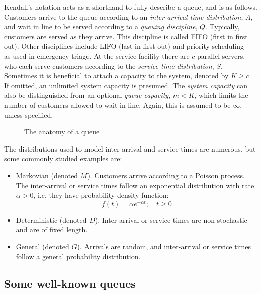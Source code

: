 Kendall's notation acts as a shorthand to fully describe a queue, and is as
follows. Customers arrive to the queue according to an \emph{inter-arrival time
distribution}, \(A\), and wait in line to be served according to a \emph{queuing
discipline}, \(Q\). Typically, customers are served as they arrive. This
discipline is called FIFO (first in first out). Other disciplines include LIFO
(last in first out) and priority scheduling --- as used in emergency triage. At
the service facility there are \(c\) parallel servers, who each serve customers
according to the \emph{service time distribution}, \(S\). Sometimes it is
beneficial to attach a capacity to the system, denoted by \(K \ge c\). If
omitted, an unlimited system capacity is presumed. The \emph{system capacity}
can also be distinguished from an optional \emph{queue capacity}, \(m < K\),
which limits the number of customers allowed to wait in line. Again, this is
assumed to be \(\infty\), unless specified.

\begin{figure}[htbp]
    \centering%
    \resizebox{\imgwidth}{!}{%
        
    }\caption{The anatomy of a queue}\label{fig:queue}
\end{figure}

The distributions used to model inter-arrival and service times are numerous,
but some commonly studied examples are:

\begin{itemize}
    \item Markovian (denoted \(M\)). Customers arrive according to a Poisson
        process. The inter-arrival or service times follow an exponential
        distribution with rate \(\alpha > 0\), i.e. they have probability
        density function:
        \begin{equation}\label{eq:exponential}
            f(t) = \alpha e^{-\alpha t}; \quad t \ge 0
        \end{equation}
    \item Deterministic (denoted \(D\)). Inter-arrival or service times are
        non-stochastic and are of fixed length.
    \item General (denoted \(G\)). Arrivals are random, and inter-arrival or
        service times follow a general probability distribution.
\end{itemize}

\subsection{Some well-known queues}\label{subsec:known}

